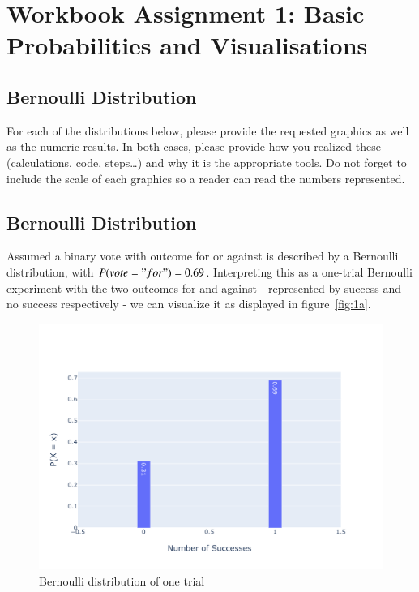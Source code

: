 \chapter{Workbook Assignment 1: Basic Probabilities and Visualisations}

\section{Bernoulli Distribution}
For each of the distributions below, please provide the requested graphics as well as the numeric results. In both cases, please provide how you realized these (calculations, code, steps…) and why it is the appropriate tools. Do not forget to include the scale of each graphics so a reader can read the numbers represented.

\section{Bernoulli Distribution}

Assumed a binary vote with outcome for or against is described by a Bernoulli distribution, with $P(vote = "for") = 0.69$. 
Interpreting this as a one-trial Bernoulli experiment with the two outcomes for and against - represented by success and no success respectively - we can visualize it as displayed in figure~\eqref{fig:1a}.


\begin{figure}[h]
\centering
\includegraphics[width=16cm]{pics/1a.pdf}
\caption{Bernoulli distribution of one trial}
\label{fig:1a}
\end{figure}
\FloatBarrier


